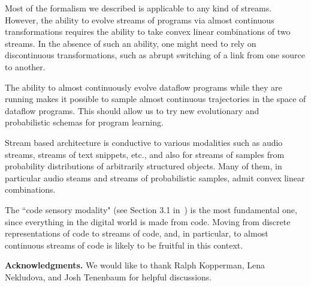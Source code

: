 \documentclass{llncs}
\begin{document}
Most of the formalism we described is applicable to any kind of streams. However, the ability to evolve streams of programs via almost continuous
transformations requires the ability to take convex linear combinations of two streams. In the absence of such an ability, one might need
to rely on discontinuous transformations, such as abrupt switching of a link from one source to another.

The ability to almost continuously evolve dataflow programs while they are running makes it possible
to sample almost continuous trajectories in the space of dataflow programs. This should allow us to try new evolutionary and
probabilistic schemas for
program learning.


Stream based architecture is conductive to various modalities such as audio streams, streams of text snippets, etc., and also for
streams of samples from probability distributions of arbitrarily structured objects. Many of them, in particular audio steams and
streams of probabilistic samples, admit convex linear combinations.

The ``code sensory modality" (see Section 3.1 in~\cite{EYudkowsky})
is the most fundamental one, since everything in the digital world is made from code. Moving from discrete
representations of code to streams of code, and, in particular, to almost continuous streams of code is likely to be fruitful
in this context.

{\bf Acknowledgments.} We would like to thank Ralph Kopperman, Lena Nekludova, and Josh Tenenbaum for helpful discussions.
\end{document}
